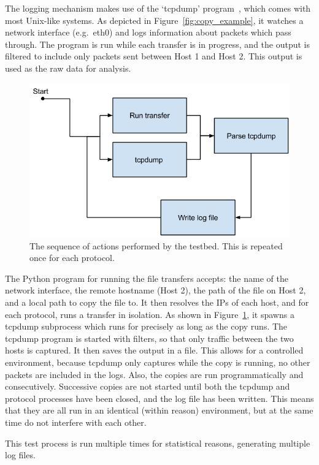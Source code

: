 \documentclass{sig-alternate-05-2015}
\begin{document}
The logging mechanism makes use of the `tcpdump' program~\cite{tcpdump}, which comes with most Unix-like systems. As depicted in Figure~\ref{fig:copy_example}, it watches a network interface (e.g.\ eth0) and logs information about packets which pass through. The program is run while each transfer is in progress, and the output is filtered to include only packets sent between Host 1 and Host 2. This output is used as the raw data for analysis.

\begin{figure}[t]
\centering
	\includegraphics[width=.8\linewidth]{img/loop}
\caption{The sequence of actions performed by the testbed. This is repeated once for each protocol.\label{fig:testbed_sequence}}
\end{figure}

The Python program for running the file transfers accepts: the name of the network interface, the remote hostname (Host 2), the path of the file on Host 2, and a local path to copy the file to.
It then resolves the IPs of each host, and for each protocol, runs a transfer in isolation. 
As shown in Figure~\ref{fig:testbed_sequence}, it spawns a tcpdump subprocess which runs for precisely as long as the copy runs. The tcpdump program is started with filters, so that only traffic between the two hosts is captured. It then saves the output in a file.
This allows for a controlled environment, because tcpdump only captures while the copy is running, no other packets are included in the logs. Also, the copies are run programmatically and consecutively. Successive copies are not started until both the tcpdump and protocol processes have been closed, and the log file has been written. This means that they are all run in an identical (within reason) environment, but at the same time do not interfere with each other.

This test process is run multiple times for statistical reasons, generating multiple log files.
\end{document}
